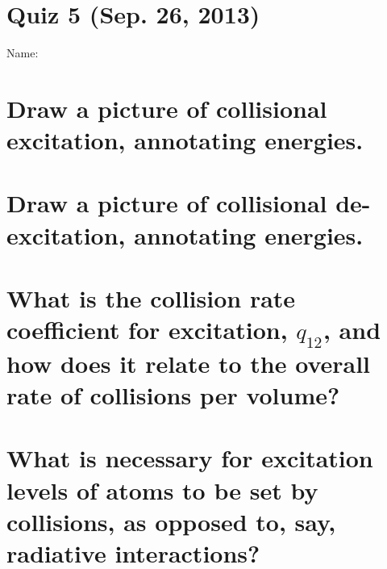 \documentclass[11pt]{article}
\begin{document}
\pagestyle{empty}
\parindent=0pt

\section*{\centering Quiz 5 (Sep. 26, 2013)}

{\large
Name:\\
}

\section{Draw a picture of collisional excitation, annotating energies.}
\vspace{1.5in}
\section{Draw a picture of collisional de-excitation, annotating energies.}
\vspace{1.5in}

\section{What is the collision rate coefficient for excitation, $q_{12}$, and how does it
relate to the overall rate of collisions per volume?}
\vspace{1.5in}

\section{What is necessary for excitation levels of atoms to be set by collisions, as opposed
to, say, radiative interactions?}
~
\vspace{1.5in}
\end{document}
